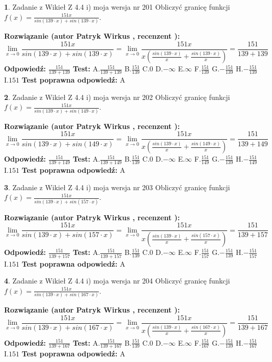 \documentclass[12pt, a4paper]{article}
\theoremstyle{definition} %
\newtheorem{zad}{}
\newcommand{\zadStart}[1]{\begin{zad}#1\newline}
\newcommand{\zadStop}{\end{zad}}
\newcommand{\rozwStart}[2]{\noindent \textbf{Rozwiązanie (autor #1 , recenzent #2): }\newline}
\newcommand{\rozwStop}{\newline}
\newcommand{\odpStart}{\noindent \textbf{Odpowiedź:}\newline}
\newcommand{\odpStop}{\newline}
\newcommand{\testStart}{\noindent \textbf{Test:}\newline}
\newcommand{\testStop}{\newline}
\newcommand{\kluczStart}{\noindent \textbf{Test poprawna odpowiedź:}\newline}
\newcommand{\kluczStop}{\newline}
\begin{document}
\zadStart{Zadanie z Wikieł Z 4.4 i) moja wersja nr 201}
Obliczyć granicę funkcji $f(x)=\frac{151x}{sin(139\cdot x) +sin(139\cdot x)}$.
\zadStop
\rozwStart{Patryk Wirkus}{}
$$\lim\limits_{x\to 0}\frac{151x}{sin(139\cdot x) +sin(139\cdot x)}=\lim\limits_{x\to 0}\frac{151x}{x(\frac{sin(139\cdot x)}{x}+\frac{sin(139\cdot x)}{x})}=\frac{151}{139+139}$$
\rozwStop
\odpStart
$\frac{151}{139+139}$
\odpStop
\testStart
A.$\frac{151}{139+139}$
B.$\frac{151}{139}$
C.$0$
D.$-\infty$
E.$\infty$
F.$\frac{151}{139}$
G.$-\frac{151}{139}$
H.$-\frac{151}{139}$
I.$151$
\testStop
\kluczStart
A
\kluczStop



\zadStart{Zadanie z Wikieł Z 4.4 i) moja wersja nr 202}
Obliczyć granicę funkcji $f(x)=\frac{151x}{sin(139\cdot x) +sin(149\cdot x)}$.
\zadStop
\rozwStart{Patryk Wirkus}{}
$$\lim\limits_{x\to 0}\frac{151x}{sin(139\cdot x) +sin(149\cdot x)}=\lim\limits_{x\to 0}\frac{151x}{x(\frac{sin(139\cdot x)}{x}+\frac{sin(149\cdot x)}{x})}=\frac{151}{139+149}$$
\rozwStop
\odpStart
$\frac{151}{139+149}$
\odpStop
\testStart
A.$\frac{151}{139+149}$
B.$\frac{151}{139}$
C.$0$
D.$-\infty$
E.$\infty$
F.$\frac{151}{149}$
G.$-\frac{151}{139}$
H.$-\frac{151}{149}$
I.$151$
\testStop
\kluczStart
A
\kluczStop



\zadStart{Zadanie z Wikieł Z 4.4 i) moja wersja nr 203}
Obliczyć granicę funkcji $f(x)=\frac{151x}{sin(139\cdot x) +sin(157\cdot x)}$.
\zadStop
\rozwStart{Patryk Wirkus}{}
$$\lim\limits_{x\to 0}\frac{151x}{sin(139\cdot x) +sin(157\cdot x)}=\lim\limits_{x\to 0}\frac{151x}{x(\frac{sin(139\cdot x)}{x}+\frac{sin(157\cdot x)}{x})}=\frac{151}{139+157}$$
\rozwStop
\odpStart
$\frac{151}{139+157}$
\odpStop
\testStart
A.$\frac{151}{139+157}$
B.$\frac{151}{139}$
C.$0$
D.$-\infty$
E.$\infty$
F.$\frac{151}{157}$
G.$-\frac{151}{139}$
H.$-\frac{151}{157}$
I.$151$
\testStop
\kluczStart
A
\kluczStop



\zadStart{Zadanie z Wikieł Z 4.4 i) moja wersja nr 204}
Obliczyć granicę funkcji $f(x)=\frac{151x}{sin(139\cdot x) +sin(167\cdot x)}$.
\zadStop
\rozwStart{Patryk Wirkus}{}
$$\lim\limits_{x\to 0}\frac{151x}{sin(139\cdot x) +sin(167\cdot x)}=\lim\limits_{x\to 0}\frac{151x}{x(\frac{sin(139\cdot x)}{x}+\frac{sin(167\cdot x)}{x})}=\frac{151}{139+167}$$
\rozwStop
\odpStart
$\frac{151}{139+167}$
\odpStop
\testStart
A.$\frac{151}{139+167}$
B.$\frac{151}{139}$
C.$0$
D.$-\infty$
E.$\infty$
F.$\frac{151}{167}$
G.$-\frac{151}{139}$
H.$-\frac{151}{167}$
I.$151$
\testStop
\kluczStart
A
\kluczStop
\end{document}
